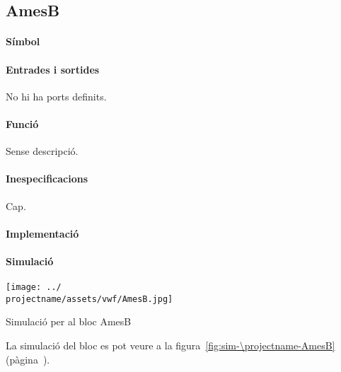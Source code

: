 \subsection{\label{sub:\projectname-AmesB} \textsf{AmesB}}

\paragraph{Símbol}

\begin{center}  \end{center}

\paragraph{Entrades i sortides}

No hi ha ports definits.

\paragraph{Funció}

Sense descripció.

\paragraph{Inespecificacions}

Cap.

\paragraph{Implementació}





\paragraph{Simulació}

\begin{contendfig}
  \begin{center}
    \texttt{[image: ../\\projectname/assets/vwf/AmesB.jpg]}
  \end{center}
  \caption{\label{fig:sim-\projectname-AmesB} Simulació per al bloc \textsf{AmesB}}
\end{contendfig}

La simulació del bloc es pot veure a la figura~\ref{fig:sim-\projectname-AmesB} (pàgina~\pageref{fig:sim-\projectname-AmesB}).


\vspace{1cm}
